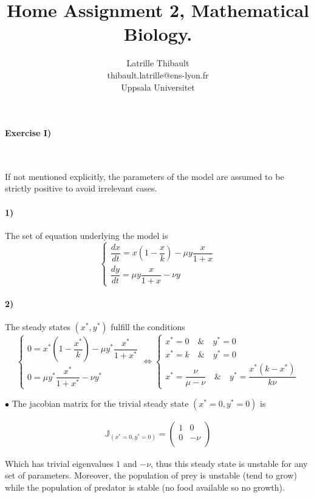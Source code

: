 \documentclass{article}
\author{Latrille Thibault\\
\small thibault.latrille@ens-lyon.fr\\[-0.8ex]
\small Uppsala Universitet\\}
\title{Home Assignment 2, Mathematical Biology.}
\begin{document}
\maketitle
\paragraph{Exercise I)}
\

If not mentioned explicitly, the parameters of the model are assumed to be strictly positive to avoid irrelevant cases.
\paragraph{1)}
The set of equation underlying the model is 
$$
\left \{
\begin{array}{l}
 \dfrac{dx}{dt}=x\left(1-\dfrac{x}{k}\right) -\mu y \dfrac{x}{1+x} \\
  \dfrac{dy}{dt}=\mu y \dfrac{x}{1+x}-\nu y
    \end{array}
\right. 
$$

\paragraph{2)}
The steady states $(x^*,y^*)$ fulfill the conditions 
$$
\left \{
\begin{array}{l}
 0=x^*\left(1-\dfrac{x^*}{k}\right) -\mu y^* \dfrac{x^*}{1+x^*} \\
  0=\mu y^* \dfrac{x^*}{1+x^*}-\nu y^*
    \end{array}
\right. 
\iff
\left \{
\begin{array}{l}
 x^*=0 \quad \& \quad y^*=0 \\
  x^*=k \quad \& \quad y^*=0 \\
  x^*=\dfrac{\nu}{\mu-\nu} \quad \& \quad y^*=\dfrac{x^*(k-x^*)}{k\nu}
    \end{array}
\right. 
$$

$\bullet$ The jacobian matrix for the trivial steady state $(x^*=0,y^*=0)$ is 

\begin{align*}
\mathbb{J}_{(x^*=0,y^*=0)}=
\begin{pmatrix}
1 & 0  \\
0 & -\nu   \\
\end{pmatrix}
\end{align*}

Which has trivial eigenvalues $1$ and $-\nu$, thus this steady state is unstable for any set of parameters. 
Moreover, the population of prey is unstable (tend to grow) while the population of predator is stable (no food available so no growth).
\end{document}
